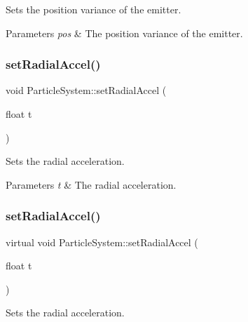 Sets the position variance of the emitter.


\begin{DoxyParams}{Parameters}
{\em pos} & The position variance of the emitter. \\
\hline
\end{DoxyParams}
\mbox{\label{classParticleSystem_a9945680801a2d3a81315c5953ed1510f}} 
\subsubsection{\texorpdfstring{set\+Radial\+Accel()}{setRadialAccel()}\hspace{0.1cm}{\footnotesize\ttfamily [1/2]}}
{\footnotesize\ttfamily void Particle\+System\+::set\+Radial\+Accel (\begin{DoxyParamCaption}\item[{float}]{t }\end{DoxyParamCaption})\hspace{0.3cm}{\ttfamily [virtual]}}

Sets the radial acceleration.


\begin{DoxyParams}{Parameters}
{\em t} & The radial acceleration. \\
\hline
\end{DoxyParams}
\mbox{\label{classParticleSystem_adcdaacf01a79421718f2c20e15660c08}} 
\subsubsection{\texorpdfstring{set\+Radial\+Accel()}{setRadialAccel()}\hspace{0.1cm}{\footnotesize\ttfamily [2/2]}}
{\footnotesize\ttfamily virtual void Particle\+System\+::set\+Radial\+Accel (\begin{DoxyParamCaption}\item[{float}]{t }\end{DoxyParamCaption})\hspace{0.3cm}{\ttfamily [virtual]}}

Sets the radial acceleration.


